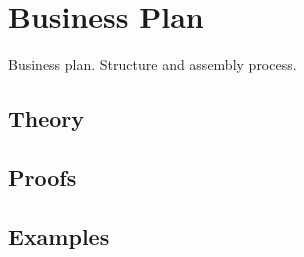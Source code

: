 
\section{Business Plan}
\label{sec:2.6.16-business-plan}

\begin{ticket}
Business plan. Structure and assembly process.
\end{ticket}

\subsection*{Theory}

\subsection*{Proofs}

\subsection*{Examples}
